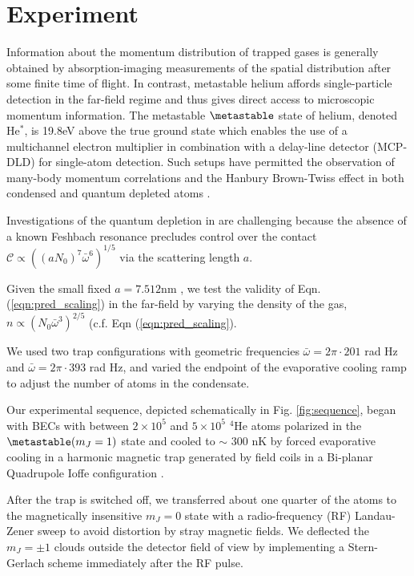 	
	

\section{Experiment} 
	Information about the momentum distribution of trapped gases is generally obtained by absorption-imaging measurements of the spatial distribution after some finite time of flight.
	In contrast, metastable helium affords single-particle detection in the far-field regime and thus gives direct access to microscopic momentum information.
	The metastable $\metastable$ state of helium, denoted He$^*$, is 19.8eV above the true ground state \cite{Hodgman09} which enables the use of a multichannel electron multiplier in combination with a delay-line detector (MCP-DLD) \cite{Manning10} for single-atom detection.
	Such setups have permitted the observation of many-body momentum correlations \cite{Hodgman11,Dall13} and the Hanbury Brown-Twiss effect in both condensed \cite{Schellekens05,Jeltes07,Manning10,Dall11} and quantum depleted atoms \cite{Cayla20}.
	
	
	Investigations of the quantum depletion in \mhe are challenging because the absence of a known Feshbach resonance precludes control over the contact $\mathcal{C}\propto((a N_0)^7\bar{\omega}^6)^{1/5}$ via the scattering length $a$.
	
	Given the small fixed $a=7.512$nm \cite{Moal06}, we test the validity of Eqn.
	(\ref{eqn:pred_scaling}) in the far-field by varying the density of the gas, $n\propto\left(N_{0}\bar{\omega}^3\right)^{2/5}$ (c.f.
	Eqn (\ref{eqn:pred_scaling}).
	
	We used two trap configurations with geometric frequencies $\bar{\omega} = 2\pi \cdot201$ rad Hz and $\bar{\omega} = 2\pi \cdot393$ rad Hz, and varied the endpoint of the evaporative cooling ramp to adjust the number of atoms in the condensate.
	
	
	Our experimental sequence, depicted schematically in Fig.
	\ref{fig:sequence}, began with BECs with between $2\times 10^5$ and $5\times 10^5$ $^4$He atoms polarized in the $\metastable(m_J=1)$ state and cooled to $\sim$ 300 nK by forced evaporative cooling in a harmonic magnetic trap generated by field coils in a Bi-planar Quadrupole Ioffe configuration \cite{Dall07}.
	
	After the trap is switched off, we transferred about one quarter of the atoms to the magnetically insensitive $m_J=0$ state with a radio-frequency (RF) Landau-Zener sweep to avoid distortion by stray magnetic fields.
	We deflected the $m_J=\pm 1$ clouds outside the detector field of view by implementing a Stern-Gerlach scheme immediately after the RF pulse.
	
